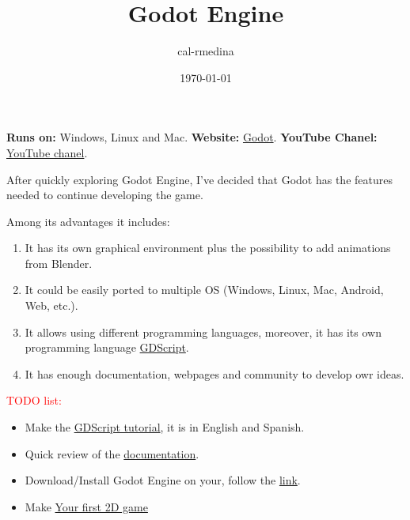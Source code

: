 \documentclass{article}
\title{Godot Engine}
\date{\today}
\author{cal-rmedina}
\begin{document}
  \maketitle

\textbf{Runs on:} Windows, Linux and Mac.
\textbf{Website:} \href{https://godotengine.org/}{Godot}.
\textbf{YouTube Chanel:} \href{https://www.youtube.com/@GodotEngineOfficial/featured}{YouTube chanel}.

After quickly exploring Godot Engine, I've decided that Godot has the features
needed to continue developing the game.

Among its advantages it includes:

\begin{enumerate}
  \item It has its own graphical environment plus the possibility to add animations
from Blender.
  \item It could be easily ported to multiple OS (Windows, Linux, Mac, Android,
Web, etc.).
  \item It allows using different programming languages, moreover, it has its
own programming language \href{https://gdscript.com}{GDScript}.
  \item It has enough documentation, webpages and community to develop owr ideas.
\end{enumerate}

\textcolor{red}{TODO list:}

\begin{itemize}
  \item Make the \href{https://gdquest.github.io/learn-gdscript}{GDScript
tutorial}, it is in English and Spanish.
  \item Quick review of the \href{https://docs.godotengine.org/en/stable}{documentation}.
  \item Download/Install Godot Engine on your, follow the \href{https://godotengine.org/download/windows}{link}.
  \item Make \href{https://docs.godotengine.org/en/stable/getting_started/first_2d_game/index.html}{Your first 2D game}
\end{itemize}
\end{document}
